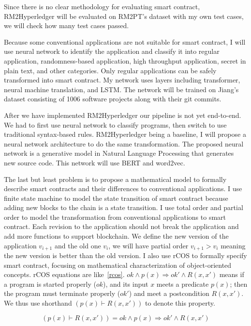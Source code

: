 Since there is no clear methodology for evaluating smart contract, RM2\-Hyper\-ledger will be evaluated on RM2PT's dataset with my own test cases,
we will check how many test cases passed.

Because some conventional applications are not suitable for smart contract,
I will use neural network to identify the application and classify it into regular application, randomness-based application,
high throughput application, secret in plain text, and other categories.
Only regular applications can be safely transformed into smart contract.
My network uses layers including transformer, neural machine translation, and LSTM. The network will be trained on Jiang's dataset consisting of \num{1006} software projects along with their git commits.

After we have implemented RM2Hyperledger our pipeline is not yet end-to-end. We had to first use neural network to classify programs, then switch to use traditional syntax-based rules.
RM2\-Hyperledger being a baseline, I will propose a neural network architecture to do the same transformation.
The proposed neural network is a generative model in Natural Language Processing that generates new source code.
This network will use BERT and word2vec.


The last but least problem is to propose a mathematical model to formally describe smart contracts and their differences to conventional applications.
I use finite state machine to model the state transition of smart contract because adding new blocks to the chain is a state transition.
I use total order and partial order to model the transformation from conventional applications to smart contract.
Each revision to the application should not break the application and add more functions to support blockchain.
We define the new version of the application $v_{i+1}$ and the old one  $v_i$, we will have partial order  $v_{i+1} > v_i $ meaning the new version is better than the old version.
I also use rCOS to formally specify smart contract, focusing on mathematical characterization of object-oriented concepts.
rCOS equations are like~\autoref{rcos}. $ ok \wedge p(x) \Rightarrow ok' \wedge R(x,x')$ means if a program is started properly ($ok$), and its input $x$ meets a predicate $p(x)$; then the program must terminate properly ($ok'$) and meet a postcondition $R(x,x')$.
We thus use shorthand $(p(x)\vdash R(x,x'))$ to denote this property.

\begin{equation}\label{rcos}
(p(x)\vdash R(x,x')) = ok \wedge p(x) \Rightarrow ok' \wedge R(x,x')
\end{equation}



